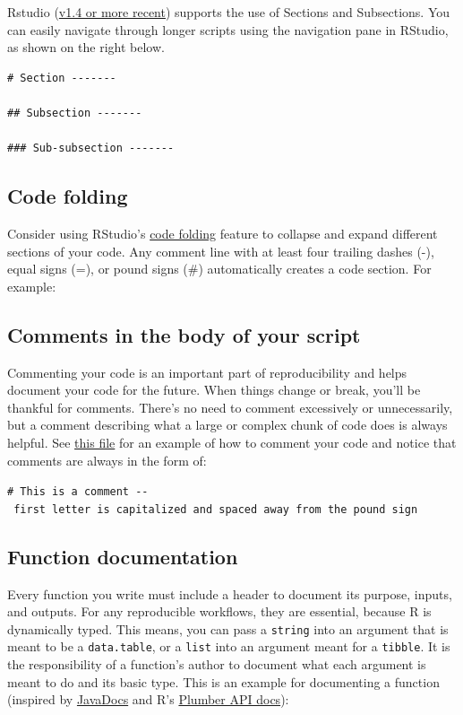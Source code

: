 \documentclass[
]{book}
\begin{document}
Rstudio (\href{https://blog.rstudio.com/2020/12/02/rstudio-v1-4-preview-little-things/}{v1.4 or more recent}) supports the use of Sections and Subsections. You can easily navigate through longer scripts using the navigation pane in RStudio, as shown on the right below.

\begin{verbatim}
# Section -------

## Subsection -------

### Sub-subsection -------
\end{verbatim}

\subsection{Code folding}\label{code-folding}

Consider using RStudio's \href{https://support.rstudio.com/hc/en-us/articles/200484568-Code-Folding-and-Sections}{code folding} feature to collapse and expand different sections of your code. Any comment line with at least four trailing dashes (-), equal signs (=), or pound signs (\#) automatically creates a code section. For example:

\subsection{Comments in the body of your script}\label{comments-in-the-body-of-your-script}

Commenting your code is an important part of reproducibility and helps document your code for the future. When things change or break, you'll be thankful for comments. There's no need to comment excessively or unnecessarily, but a comment describing what a large or complex chunk of code does is always helpful. See \href{https://github.com/kmishra9/Flu-Absenteeism/blob/master/Master's\%20Thesis\%20-\%20Spatial\%20Epidemiology\%20of\%20Influenza/1b\%20-\%20Map-Management.R}{this file} for an example of how to comment your code and notice that comments are always in the form of:

\texttt{\#\ This\ is\ a\ comment\ -\/-\ first\ letter\ is\ capitalized\ and\ spaced\ away\ from\ the\ pound\ sign}

\subsection{Function documentation}\label{function-documentation}

Every function you write must include a header to document its purpose, inputs, and outputs. For any reproducible workflows, they are essential, because R is dynamically typed. This means, you can pass a \texttt{string} into an argument that is meant to be a \texttt{data.table}, or a \texttt{list} into an argument meant for a \texttt{tibble}. It is the responsibility of a function's author to document what each argument is meant to do and its basic type. This is an example for documenting a function (inspired by \href{https://www.oracle.com/technetwork/java/javase/documentation/index-137868.html\#format}{JavaDocs} and R's \href{https://blog.rstudio.com/2018/10/23/rstudio-1-2-preview-plumber-integration/}{Plumber API docs}):
\end{document}
